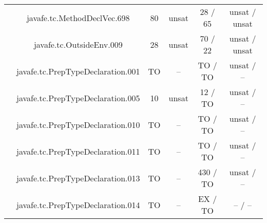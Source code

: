 \begin{table}[htbp]
\begin{minipage}{0.60\textwidth}
{\begin{tabular}[c]{c c!{\vrule width 1.5pt}c|c!{\vrule width 1.5pt}c|c|}
 			& javafe.tc.MethodDeclVec.698		   		     & 80   & unsat   & 28  / 65       & unsat / unsat     \\
 			& javafe.tc.OutsideEnv.009		   		     & 28   & unsat   & 70  / 22       & unsat / unsat     \\
		 	& javafe.tc.PrepTypeDeclaration.001	    		     & TO   & --      & TO  / TO       & unsat / --        \\
 			& javafe.tc.PrepTypeDeclaration.005	   		     & 10   & unsat   & 12  / TO       & unsat / --        \\
		 	& javafe.tc.PrepTypeDeclaration.010   			     & TO   & --      & TO  / TO       & unsat / --        \\
		 	& javafe.tc.PrepTypeDeclaration.011    			     & TO   & --      & TO  / TO       & unsat / --        \\
		 	& javafe.tc.PrepTypeDeclaration.013    			     & TO   & --      & 430 / TO       & unsat / --        \\
		 	& javafe.tc.PrepTypeDeclaration.014    			     & TO   & --      & EX  / TO       & --    / --        \\

\end{tabular}}
\end{minipage}
\end{table}
